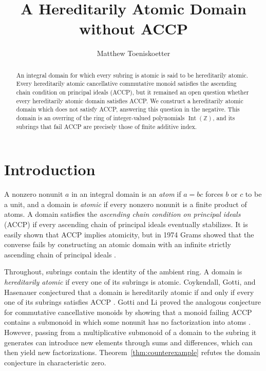 \documentclass{article}
\title{A Hereditarily Atomic Domain without ACCP}
\author{Matthew Toeniskoetter}
\theoremstyle{remark}
\begin{document}
\maketitle

\begin{abstract}
    An integral domain for which every subring is atomic is said to be hereditarily atomic.
    Every hereditarily atomic cancellative commutative monoid satisfies the ascending chain condition on principal ideals (ACCP), but it remained an open question whether every hereditarily atomic domain satisfies ACCP.
    We construct a hereditarily atomic domain which does not satisfy ACCP, answering this question in the negative.
    This domain is an overring of the ring of integer-valued polynomials $\operatorname{Int} (\mathbb{Z})$, and its subrings that fail ACCP are precisely those of finite additive index.
\end{abstract}

\section{Introduction}

A nonzero nonunit $a$ in an integral domain is an \emph{atom} if $a = bc$ forces $b$ or $c$ to be a unit, and a domain is \emph{atomic} if every nonzero nonunit is a finite product of atoms.
A domain satisfies the \emph{ascending chain condition on principal ideals} (ACCP) if every ascending chain of principal ideals eventually stabilizes.
It is easily shown that ACCP implies atomicity, but in 1974 Grams showed that the converse fails by constructing an atomic domain with an infinite strictly ascending chain of principal ideals \cite[Theorem~1.3]{Grams}.

Throughout, subrings contain the identity of the ambient ring.
A domain is \emph{hereditarily atomic} if every one of its subrings is atomic.
Coykendall, Gotti, and Hasenauer conjectured that a domain is hereditarily atomic if and only if every one of its subrings satisfies ACCP \cite[Conjecture~6.1]{CGH}.
Gotti and Li proved the analogous conjecture for commutative cancellative monoids by showing that a monoid failing ACCP contains a submonoid in which some nonunit has no factorization into atoms \cite[Theorem~4.2 and Corollary~4.3]{GLmonoids}.
However, passing from a multiplicative submonoid of a domain to the subring it generates can introduce new elements through sums and differences, which can then yield new factorizations.
Theorem~\ref{thm:counterexample} refutes the domain conjecture in characteristic zero.
\end{document}

